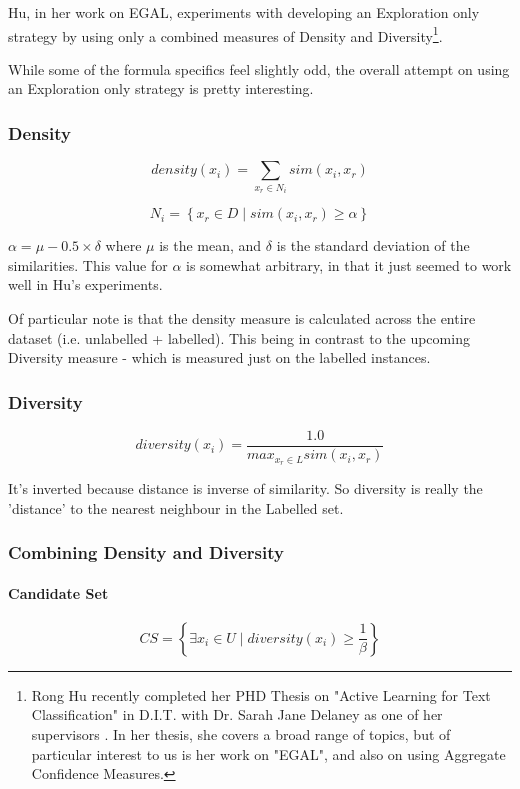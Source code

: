 \documentclass[a4paper,11pt]{report}
\begin{document}
Hu, in her work on EGAL, experiments with developing an Exploration only strategy by using only a combined measures of Density and Diversity\footnote{Rong Hu recently completed her PHD Thesis on "Active Learning for Text Classification" in D.I.T. with Dr. Sarah Jane Delaney as one of her supervisors \cite{Hu2011}. In her thesis, she covers a broad range of topics, but of particular interest to us is her work on "EGAL", and also on using Aggregate Confidence Measures.}.

While some of the formula specifics feel slightly odd, the overall attempt on using an Exploration only strategy is pretty interesting. 

\subsubsection{Density}
\[
density(x_{i})=\underset{x_{r}\in N_{i}}{\sum}sim(x_{i},x_{r})
\]

\[
N_{i}=\left\{ x_{r}\in D\mid sim(x_{i},x_{r})\geq\alpha\right\} 
\]

$\alpha=\mu-0.5\times\delta$ where $\mu$ is the mean, and $\delta$ is the standard deviation of the similarities. This value for $\alpha$ is somewhat arbitrary, in that it just seemed to work well in Hu's experiments.

Of particular note is that the density measure is calculated across the entire dataset (i.e. unlabelled + labelled). This being in contrast to the upcoming Diversity measure - which is measured just on the labelled instances.

\subsubsection{Diversity}

\[
diversity(x_{i})=\frac{1.0}{max_{x_{r}\in L}sim(x_{i},x_{r})}
\]

It's inverted because distance is inverse of similarity. So diversity is really the 'distance' to the nearest neighbour in the Labelled set.

\subsubsection{Combining Density and Diversity}

\paragraph{Candidate Set}
\[
CS=\left\{ \exists x_{i}\in U\mid diversity(x_{i})\geq\frac{1}{\beta}\right\} 
\]
\end{document}
